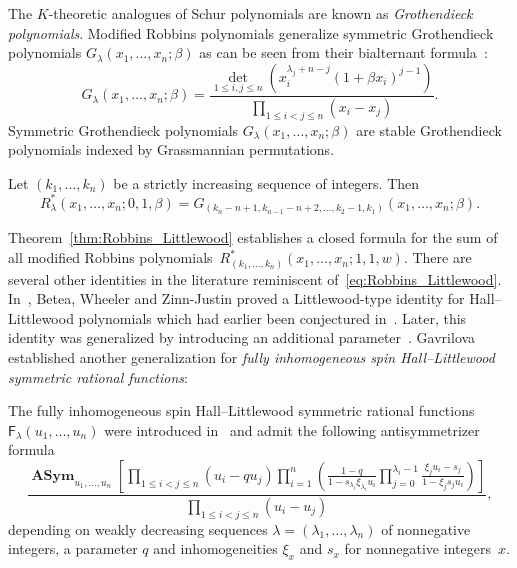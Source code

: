 \documentclass[ALCO, Unicode]{cedram}
\newcommand{\deff}[1]{\emph{#1}}
\DeclareMathOperator{\asym}{\mathbf{ASym}}
\newcommand{\F}{\mathsf{F}}
\begin{document}
	
	The $K$-theoretic analogues of Schur polynomials are known as \deff{Grothendieck polynomials}. Modified Robbins polynomials generalize symmetric Grothendieck polynomials $G_{\lambda} (x_1,\dots,x_n;\beta)$ as can be seen from their bialternant formula~\cite{IN13}:
	\begin{equation*}
		G_{\lambda} (x_1,\dots,x_n;\beta) = \frac{\det\limits_{1 \le i,j \le n} \left(x_i^{\lambda_j+n-j} (1+ \beta x_i)^{j-1}\right)}{\prod\limits_{1\le i < j \le n} (x_i - x_j)}.
	\end{equation*}
	Symmetric Grothendieck polynomials $G_{\lambda} (x_1,\dots,x_n;\beta)$ are stable Grothendieck polynomials indexed by Grassmannian permutations.
	
	\begin{prop}
		Let $(k_{1},\ldots,k_{n})$ be a strictly increasing sequence of integers. Then
		\begin{equation*}
			R_{\lambda}^{\ast}(x_{1},\ldots,x_{n};0,1,\beta) = G_{(k_n-n+1,k_{n-1}-n+2,\ldots,k_2-1,k_1)} (x_1,\dots,x_n;\beta).
		\end{equation*}
	\end{prop}
	
	Theorem~\ref{thm:Robbins_Littlewood} establishes a closed formula for the sum of all modified Robbins polynomials~$R^{\ast}_{(k_{1},\ldots,k_{n})}(x_{1},\ldots,x_{n};1,1,w)$. There are several other identities in the literature reminiscent of~\eqref{eq:Robbins_Littlewood}. In~\cite{BWZJ15}, Betea, Wheeler and Zinn-Justin proved a Littlewood-type identity for Hall--Littlewood polynomials which had earlier been conjectured in~\cite{BW16}. Later, this identity was generalized by introducing an additional parameter~\cite{WZJ16}. Gavrilova~\cite{Gav23} established another generalization for \deff{fully inhomogeneous spin Hall--Littlewood symmetric rational functions}: 
	
	
	The fully inhomogeneous spin Hall--Littlewood symmetric rational functions~$ \F_{\lambda}(u_1,\allowbreak \dots,\allowbreak u_n)$ were introduced in~\cite{BP18} and admit the following antisymmetrizer formula
	\begin{equation*}
		\frac{\asym_{u_{1},\ldots,u_{n}}\left[\prod\limits_{1\le i<j\le n}(u_i-q u_j)\prod\limits_{i=1}^{n} \left(\frac{1-q}{1-s_{\lambda_i} \xi_{\lambda_i} u_i} \prod\limits_{j=0}^{\lambda_i-1} \frac{\xi_j u_i - s_j}{1 - \xi_j s_j u_i} \right)\right]}{\prod\limits_{1\le i<j\le n}(u_{i}-u_{j})},
	\end{equation*}
	depending on weakly decreasing sequences $\lambda=(\lambda_1, \dots, \lambda_n)$ of nonnegative integers, a parameter $q$ and inhomogeneities $\xi_x$ and $s_x$ for nonnegative integers~$x$.
	
\end{document}
